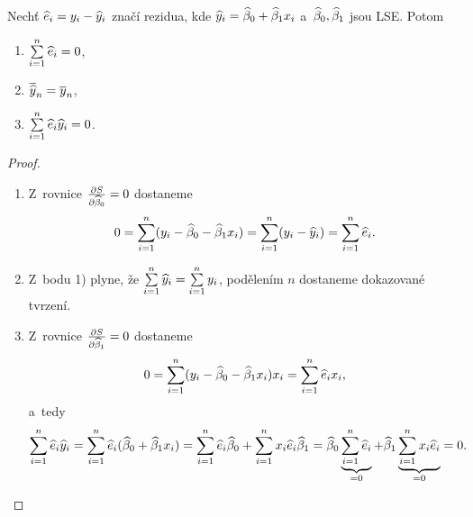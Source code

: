 \begin{lemma}\label{lemma_k_vete}
	Nechť $\widehat{e}_i = y_i-\hyi$ značí rezidua, kde $\hyi = \wbeta_0+\wbeta_1 x_i$ a~$\wbeta_0,\wbeta_1$ jsou LSE. Potom \begin{enumerate}
		\item $\sumin \widehat{e}_i = 0$,
		\item $\lhyn = \lyn$,
		\item $\sumin \widehat{e}_i\hyi = 0$.
	\end{enumerate}
\begin{proof}
	\begin{enumerate}
		\item Z~rovnice $\frac{\partial S}{\partial\wbeta_0} = 0$ dostaneme $$ 0 = \sumin (y_i-\wbeta_0-\wbeta_1 x_i) = \sumin (y_i-\hyi) = \sumin \widehat{e}_i. $$
		\item Z~bodu 1) plyne, že $\sumin \hyi = \sumin y_i$, podělením $n$ dostaneme dokazované tvrzení.
		\item Z~rovnice $\frac{\partial S}{\partial\wbeta_1} = 0$ dostaneme $$ 0 = \sumin (y_i-\wbeta_0-\wbeta_1 x_i)x_i = \sumin \hei x_i, $$ a~tedy $$ \sumin \hei\hyi = \sumin \hei (\wbeta_0+\wbeta_1 x_i) = \sumin \hei\wbeta_0+\sumin x_i \hei\wbeta_1 = \wbeta_0\underbrace{\sumin \hei}_{ = 0}+\wbeta_1\underbrace{\sumin x_i\hei}_{ = 0} = 0. $$
	\end{enumerate}
\end{proof}
\end{lemma}
